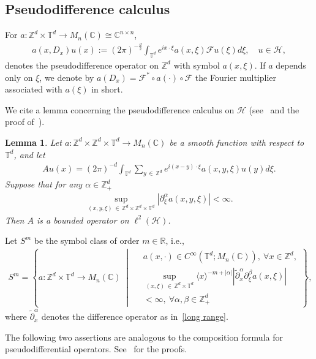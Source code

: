 \documentclass[10pt]{amsart}
\newtheorem{lemm}[theo]{Lemma}\newtheorem{prop}[theo]{Proposition}\newtheorem{coro}[theo]{Corollary}\newtheorem{conj}[theo]{Conjecture}
\theoremstyle{definition}\newtheorem{defi}[theo]{Definition}\newtheorem{rema}[theo]{Remark}\newtheorem{exam}[theo]{Example}\newtheorem{exem}[theo]{Example}\newtheorem{nota}[theo]{Notation}
\renewcommand{\a}{\alpha}
\renewcommand{\b}{\beta}
\newcommand{\x}{\xi}
\newcommand{\C}{\mathbb{C}}
\newcommand{\R}{\mathbb{R}}
\newcommand{\Z}{\mathbb{Z}}
\newcommand{\T}{\mathbb{T}}
\newcommand{\HS}{\mathcal{H}}
\newcommand{\FS}{\mathcal{F}}
\newcommand{\jap}[1]{\langle #1 \rangle}
\let\oldforall\forall
\renewcommand*{\forall}{\mathrel{\oldforall}}
\begin{document}
\subsection{Pseudodifference calculus}

For $a:\Z^d \times \T^d \to M_n(\C)\cong \C^{n\times n}$,
\begin{align*}
a(x,D_x)u(x) :=(2\pi)^{-\frac{d}{2}}\int_{\T^d} e^{ix\cdot\x} a(x,\x) \FS u(\x)d\x, \quad u\in \HS,
\end{align*}
denotes the pseudodifference operator on $\Z^d$ with symbol $a(x,\x)$. If $a$ depends only on $\x$, we denote by $a(D_x)=\FS^*\circ a(\cdot) \circ \FS$ the Fourier multiplier associated with $a(\x)$ in short.

We cite a lemma concerning the pseudodifference calculus on $\HS$ (see~\cite[Theorem~4.2.10]{R-T} and the proof of~\cite[Lemma~2.2]{T1}).

\begin{lemm}\label{PDO lemma}
Let $a:\Z^d\times\Z^d\times\T^d \to M_n(\C)$ be a smooth function with respect to $\T^d$, and let
\begin{align*}
Au(x) = (2\pi)^{-d} \int_{\T^d} \sum_{y\,\in\,\Z^d} e^{i(x-y)\cdot\x} a(x,y,\x) u(y)d\x.
\end{align*}
Suppose that for any $\a\in\Z_+^d$
\begin{align}\label{S^0}
\sup_{(x,y,\x)\,\in\,\Z^d\times\Z^d\times\T^d}\left|\partial_{\x}^\a a(x,y,\x)\right| < \infty.
\end{align}
Then $A$ is a bounded operator on $\ell^2(\HS)$.
\end{lemm}

Let $S^m$ be the symbol class of order $m\in\R$, i.e.,
\begin{align*}
S^m=\left\{ a: \Z^d\times\T^d \to M_n(\C) \;\middle|\;
\begin{aligned}
& a(x,\cdot)\in C^\infty\left(\T^d;M_n(\C)\right),\ \forall x\in\Z^d,\\ 
&\sup_{(x,\x)\,\in\,\Z^d\times\T^d} \jap{x}^{-m+|\a|} 
\left|\tilde\partial_{x}^\a\partial_{\x}^\b a(x,\x)\right|\\
&< \infty,\ \forall \a,\b\in\Z_+^d
\end{aligned}
\right\},
\end{align*}
where $\tilde\partial_{x}^\a$ denotes the difference operator as in~\eqref{long range}.

The following two assertions are analogous to the composition formula for pseudodifferential operators. See~\cite[Theorems~4.7.3 and 4.7.10]{R-T} for the proofs.
\end{document}
